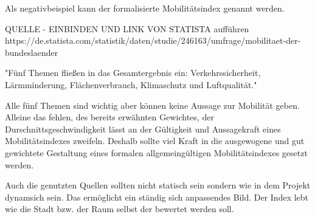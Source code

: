 Als negativbeispiel kann der formalisierte Mobilitätsindex genannt werden.

QUELLE - EINBINDEN UND LINK VON STATISTA aufführen
https://de.statista.com/statistik/daten/studie/246163/umfrage/mobilitaet-der-bundeslaender

"Fünf Themen fließen in das Gesamtergebnis ein: Verkehrssicherheit, Lärmminderung, Flächenverbrauch, Klimaschutz und Luftqualität."

Alle fünf Themen sind wichtig aber können keine Aussage zur Mobilität geben. Alleine das fehlen, des bereits erwähnten Gewichtes, der Durschnittsgeschwindigkeit lässt an der Gültigkeit und Aussagekraft eines Mobilitätsindexes zweifeln.
Deshalb sollte viel Kraft in die ausgewogene und gut gewichtete Gestaltung eines formalen allgemeingültigen Mobilitätsindexes gesetzt werden.

Auch die genutzten Quellen sollten nicht statisch sein sondern wie in dem Projekt dynamsich sein. Das ermöglicht ein ständig sich anpassendes Bild. Der Index lebt wie die Stadt bzw. der Raum selbst der bewertet werden soll.
